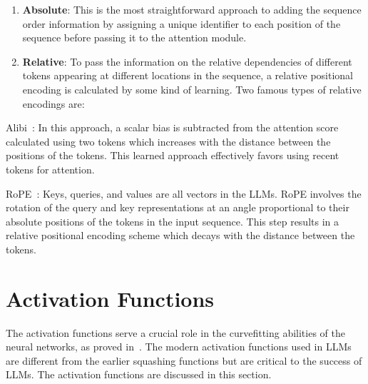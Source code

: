 \documentclass[a4paper,oneside]{book}
\begin{document}
\begin{enumerate}
    \item \textbf{Absolute}: This is the most straightforward approach to adding the sequence order information by assigning a unique identifier to each position of the sequence before passing it to the attention module.

    \item \textbf{Relative}: To pass the information on the relative dependencies of different tokens appearing at different locations in the sequence, a relative positional encoding is calculated by some kind of learning. Two famous types of relative encodings are:
\end{enumerate}

Alibi~\cite{press2021train}: In this approach, a scalar bias is subtracted from the attention score calculated using two tokens which increases with the distance between the positions of the tokens. This learned approach effectively favors using recent tokens for attention.

RoPE~\cite{su2024roformer}: Keys, queries, and values are all vectors in the LLMs. RoPE involves the rotation of the query and key representations at an angle proportional to their absolute positions of the tokens in the input sequence. This step results in a relative positional encoding scheme which decays with the distance between the tokens.

\section{Activation Functions}
The activation functions serve a crucial role in the curvefitting abilities of the neural networks, as proved in~\cite{hornik1989multilayer}. The modern activation functions used in LLMs are different from the earlier squashing functions but are critical to the success of LLMs. The activation functions are discussed in this section.
\end{document}
